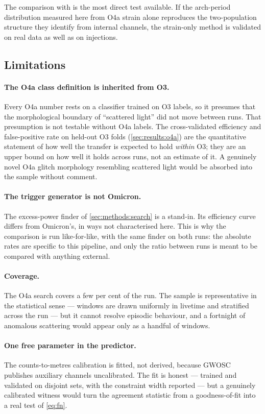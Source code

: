 The comparison with \citet{Nandi2026} is the most direct test available. If
the arch-period distribution measured here from O4a strain alone reproduces
the two-population structure they identify from internal channels, the
strain-only method is validated on real data as well as on injections.

\subsection{Limitations}

\paragraph{The O4a class definition is inherited from O3.} Every O4a number
rests on a classifier trained on O3 labels, so it presumes that the
morphological boundary of ``scattered light'' did not move between runs. That
presumption is not testable without O4a labels. The cross-validated efficiency
and false-positive rate on held-out O3 folds
(\cref{sec:results:o4a}) are the quantitative statement of how well the
transfer is expected to hold \emph{within} O3; they are an upper bound on how
well it holds across runs, not an estimate of it. A genuinely novel O4a glitch
morphology resembling scattered light would be absorbed into the sample
without comment.

\paragraph{The trigger generator is not Omicron.} The excess-power finder of
\cref{sec:methods:search} is a stand-in. Its efficiency curve differs from
Omicron's, in ways not characterised here. This is why the comparison is run
like-for-like, with the same finder on both runs: the absolute rates are
specific to this pipeline, and only the ratio between runs is meant to be
compared with anything external.

\paragraph{Coverage.} The O4a search covers a few per cent of the run. The
sample is representative in the statistical sense --- windows are drawn
uniformly in livetime and stratified across the run --- but it cannot resolve
episodic behaviour, and a fortnight of anomalous scattering would appear only
as a handful of windows.

\paragraph{One free parameter in the predictor.} The counts-to-metres
calibration is fitted, not derived, because GWOSC publishes auxiliary channels
uncalibrated. The fit is honest --- trained and validated on disjoint sets,
with the constraint width reported --- but a genuinely calibrated witness
would turn the agreement statistic from a goodness-of-fit into a real test of
\cref{eq:fn}.

